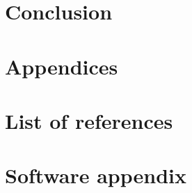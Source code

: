 \chapter{Conclusion}

\chapter{Appendices}

\chapter{List of references}

\newpage
\listoffigures
{}
\newpage
\listoftables
{}
\newpage
\chapter{Software appendix}


\printbibliography

